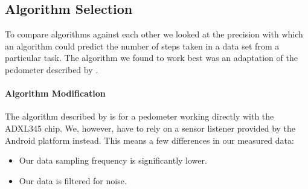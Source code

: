 \subsection{Algorithm Selection}
To compare algorithms against each other we looked at the precision with which an algorithm could predict the number of steps taken in a data set from a particular task. The algorithm we found to work best was an adaptation of the pedometer described by \citet{zhao:pedometer}.

\paragraph{Algorithm Modification}
The algorithm described by \citet{zhao:pedometer} is for a pedometer working directly with the ADXL345 chip. We, however, have to rely on a sensor listener provided by the Android platform instead. This means a few differences in our measured data:
\begin{itemize}
\item Our data sampling frequency is significantly lower. 
\item Our data is filtered for noise.
\end{itemize} 

